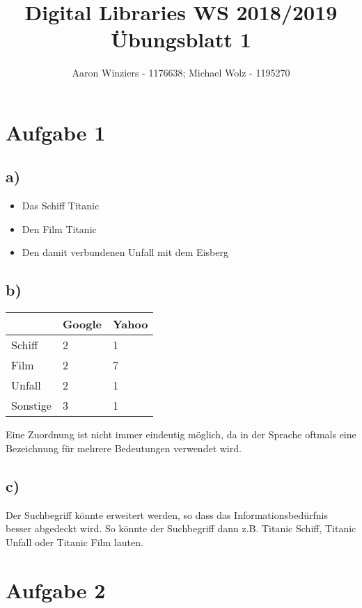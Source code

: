 \documentclass[11pt,a4paper,parskip=half ]{scrartcl}
\author{Aaron Winziers - 1176638; Michael Wolz - 1195270}
\title{Digital Libraries WS 2018/2019\\\LARGE{Übungsblatt 1}}
\begin{document}
	\maketitle
	
	\section*{Aufgabe 1}
	
	\subsection*{a)}
	
	\begin{itemize}
		\item Das Schiff \glqq{}Titanic\grqq{}
		\item Den Film \glqq{}Titanic\grqq{}
		\item Den damit verbundenen Unfall mit dem Eisberg
	\end{itemize}
	
	\subsection*{b)}
	\begin{table}[H]
		\centering
		\begin{tabular}{|l|l|l|}
			\hline
			& Google & Yahoo \\ \hline
			Schiff   & 2      & 1     \\ \hline
			Film     & 2      & 7     \\ \hline
			Unfall   & 2      & 1     \\ \hline
			Sonstige & 3      & 1     \\ \hline
		\end{tabular}
	\end{table}
	Eine Zuordnung ist nicht immer eindeutig möglich, da in der Sprache oftmals
	eine Bezeichnung für mehrere Bedeutungen verwendet wird. 
	
	\subsection*{c)}
	Der Suchbegriff könnte erweitert werden, so dass das Informationsbedürfnis
	besser abgedeckt wird. So könnte der Suchbegriff dann z.B.  \glqq{}Titanic
	Schiff\grqq{}, \glqq{}Titanic Unfall\grqq{} oder \glqq{}Titanic Film\grqq{}
	lauten. 
	
	
	\section*{Aufgabe 2}
	
\end{document}
